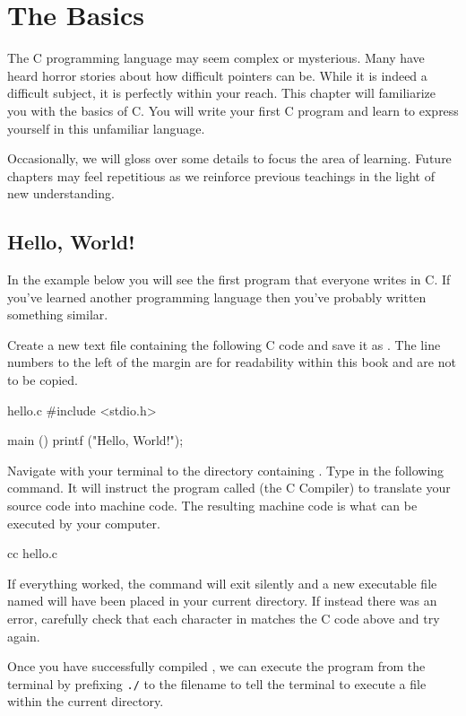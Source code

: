 \chapter{The Basics}

The C programming language may seem complex or mysterious.  Many have heard
horror stories about how difficult pointers can be. While it is indeed a
difficult subject, it is perfectly within your reach.  This chapter will
familiarize you with the basics of C.  You will write your first C program and
learn to express yourself in this unfamiliar language.

Occasionally, we will gloss over some details to focus the area of learning.
Future chapters may feel repetitious as we reinforce previous teachings in the
light of new understanding.

\section{Hello, World!}

In the example below you will see the first program that everyone writes in C.
If you've learned another programming language then you've probably written
something similar.

Create a new text file containing the following C code and save it as
.  The line numbers to the left of the margin are for readability
within this book and are not to be copied.

\begin{code}{hello.c}
#include <stdio.h>

main ()
{
    printf ("Hello, World!\n");
}
\end{code}

Navigate with your terminal to the directory containing . Type in
the following command. It will instruct the program called  (the C
Compiler) to translate your source code into machine code. The resulting
machine code is what can be executed by your computer.

\begin{Terminal}
cc hello.c
\end{Terminal}

If everything worked, the  command will exit silently and a new
executable file named  will have been placed in your current
directory. If instead there was an error, carefully check that each character in
 matches the C code above and try again.

Once you have successfully compiled , we can execute the program
from the terminal by prefixing \verb|./| to the filename to tell the terminal
to execute a file within the current directory.

